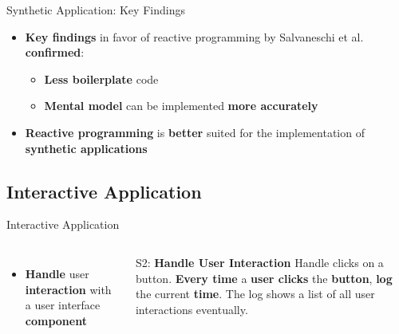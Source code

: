 \documentclass{beamer}
\begin{document}

\begin{frame}{Synthetic Application: Key Findings}
	\begin{itemize}
		\item \textbf{Key findings} in favor of reactive programming by Salvaneschi et al. \cite{7827078} \textbf{confirmed}:\smallskip
		\begin{itemize}
			\item \textbf{Less boilerplate} code\smallskip
			\item \textbf{Mental model} can be implemented \textbf{more accurately}
		\end{itemize}\bigskip
		\item \textbf{Reactive programming} is \textbf{better} suited for the implementation of \textbf{synthetic applications}
	\end{itemize}
\end{frame}


\subsection*{Interactive Application}
\begin{frame}[t]{Interactive Application}
	\begin{columns}[t]
			\begin{itemize}
				\item \textbf{Handle} user \textbf{interaction} with a user interface \textbf{component}
			\end{itemize}

			\begin{block}{S2: \textbf{Handle User Interaction}}
				Handle clicks on a button. \textbf{Every time} a \textbf{user clicks} the \textbf{button}, \textbf{log} the current \textbf{time}. The log shows a list of all user interactions eventually.
			\end{block}
	\end{columns}
\end{frame}
\end{document}
